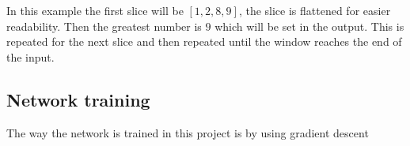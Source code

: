 In this example the first slice will be $[1, 2, 8, 9]$, the slice is flattened for easier readability. Then the greatest number is $9$ which will be set in the output. This is repeated for the next slice and then repeated until the window reaches the end of the input.

\subsection{Network training}

The way the network is trained in this project is by using gradient descent
